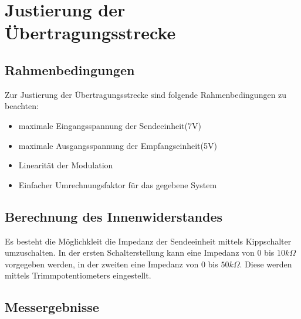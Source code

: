 \section{Justierung der Übertragungsstrecke}
\subsection{Rahmenbedingungen}
Zur Justierung der Übertragungsstrecke sind folgende Rahmenbedingungen zu beachten:
\begin{itemize}
\item maximale Eingangsspannung der Sendeeinheit(7V)
\item maximale Ausgangsspannung der Empfangseinheit(5V)
\item Linearität der Modulation
\item Einfacher Umrechnungsfaktor für das gegebene System
\end{itemize}

\subsection{Berechnung des Innenwiderstandes}
Es besteht die Möglichkleit die Impedanz der Sendeeinheit mittels Kippschalter umzuschalten. In der ersten Schalterstellung kann eine Impedanz von 0 bis $10k\Omega$ vorgegeben werden, in der zweiten eine Impedanz von 0 bis $50k\Omega$. Diese werden mittels Trimmpotentiometers eingestellt. 
\subsection{Messergebnisse}
  	\begin{figure}[H]
		
		\end{figure}
		\begin{figure}[H]
	\end{figure}
	\begin{figure}[H]
		\end{figure}
		\begin{figure}[H]
	\end{figure}
 